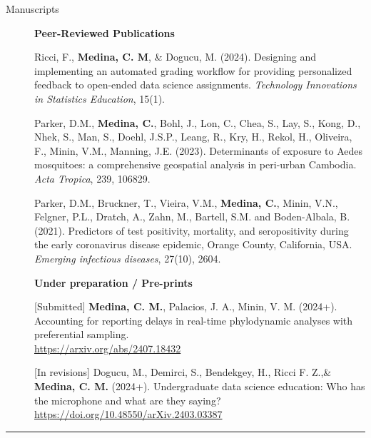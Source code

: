 \documentclass{article}
\begin{document}
	
	\begin{description}
		\vspace{-2mm}
		
		\item[Manuscripts] \hspace*{.1in} 
		
		\textbf{Peer-Reviewed Publications}
		
		\setlength{\leftskip}{0.5cm}
		
		Ricci, F., \textbf{Medina, C. M}, \& Dogucu, M. (2024). Designing and implementing an automated grading workflow for providing personalized feedback to open-ended data science assignments. \textit{Technology Innovations in Statistics Education}, 15(1).
		\vspace*{1mm}
		
		Parker, D.M., \textbf{Medina, C.}, Bohl, J., Lon, C., Chea, S., Lay, S., Kong, D., Nhek, S., Man, S., Doehl, J.S.P., Leang, R., Kry, H., Rekol, H., Oliveira, F., Minin, V.M., Manning, J.E. (2023). Determinants of exposure to Aedes mosquitoes: a comprehensive geospatial analysis in peri-urban Cambodia. \textit{Acta Tropica}, 239, 106829. 
		\vspace*{1mm}
		
		Parker, D.M., Bruckner, T., Vieira, V.M., \textbf{Medina, C.}, Minin, V.N., Felgner, P.L., Dratch, A., Zahn, M., Bartell, S.M. and Boden-Albala, B. (2021). Predictors of test positivity, mortality, and seropositivity during the early coronavirus disease epidemic, Orange County, California, USA. \textit{Emerging infectious diseases}, 27(10), 2604.
		\vspace*{1mm}
		
		\setlength{\leftskip}{0cm}
		
		\textbf{Under preparation / Pre-prints}
		
		\setlength{\leftskip}{0.5cm}
		
		[Submitted] \textbf{Medina, C. M.}, Palacios, J. A., Minin, V. M. (2024+). Accounting for reporting delays in real-time phylodynamic analyses with preferential sampling.\\
		\url{https://arxiv.org/abs/2407.18432}
		\vspace*{1mm}
		
		[In revisions] Dogucu, M., Demirci, S., Bendekgey, H., Ricci F. Z.,\& \textbf{Medina, C. M.} (2024+). Undergraduate data science education: Who has the microphone and what are they saying?\\
		\url{https://doi.org/10.48550/arXiv.2403.03387}
		\vspace*{1mm}
		
	\end{description}
	\vspace{-2mm}
	\rule{\linewidth}{1pt}
	
\end{document}
